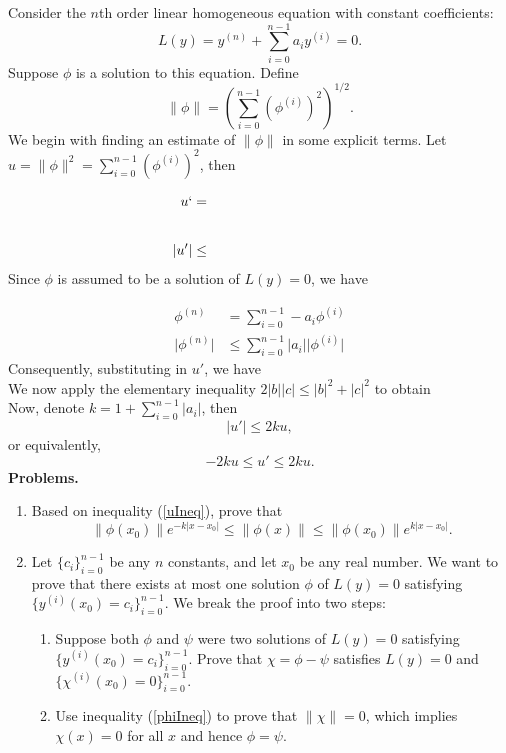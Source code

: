 \documentclass[10pt]{article}
\title{}
\date{}
\newcommand{\norm}[1]{\lVert #1 \rVert}
\newcommand{\abs}[1]{\lvert #1 \rvert}
\begin{document}
Consider the $n$th order linear homogeneous equation with constant coefficients:
\[
	L(y) =y^{(n)} +  \sum_{i = 0}^{n - 1}a_iy^{(i)} = 0.
\]
Suppose $\phi$ is a solution to this equation. Define
\[
\norm{\phi} = \left(\sum_{i = 0}^{n - 1} {\left(\phi^{(i)}\right)^2}\right)^{1/2}.
\]
We begin with finding an estimate of $\norm{\phi}$ in some explicit terms. Let $u = \norm{\phi}^2 = \sum_{i = 0}^{n - 1} {\left(\phi^{(i)}\right)^2}$, then

\begin{align*}
u ` &=\hspace{10em} \\[2em]
\abs{u'}& \leq\\
\end{align*}
Since $\phi$ is assumed to be a solution of $L(y) = 0$, we have

\begin{align*}
	\phi^{(n)} &= \sum_{i = 0}^{n - 1} -a_i\phi^{(i)}\\
	\abs{\phi^{(n)}} &\leq  \sum_{i = 0}^{n - 1} \abs{a_i}\abs{\phi^{(i)}}
\end{align*}
Consequently, substituting in $u'$, we have
\\
We now apply the elementary inequality $2\abs{b}\abs{c} \leq \abs{b}^2 + \abs{c}^2$
to obtain
\\
Now, denote $k =1 + \sum_{i = 0}^{n - 1}\abs{a_i}$, then 
\[
\abs{u'} \leq 2ku,
\]
or equivalently, 
\begin{equation}
\label{uIneq}
-2ku \leq {u'} \leq 2ku.
\end{equation}
\clearpage
\noindent
{\bf Problems.}
\begin{enumerate}
\item
Based on inequality (\ref{uIneq}), prove that
\begin{equation}
\label{phiIneq}
	\norm{\phi(x_0)}e^{-k\abs{x - x_0}} \leq \norm{\phi(x)}\leq \norm{\phi(x_0)}e^{k\abs{x - x_0}}.
\end{equation}
\item Let $\{c_i\}_{i=0}^{n-1}$ be any $n$ constants, and let $x_0$ be any real number. We want to prove that there exists at most one solution $\phi$  of $L(y) = 0$ satisfying $\{y^{(i)}(x_0) = c_i\}_{i=0}^{n-1}$. We break the proof into two steps:
\begin{enumerate}
\item
  Suppose both $\phi$ and $\psi$ were two solutions of $L(y) = 0$ satisfying $\{y^{(i)}(x_0) = c_i\}_{i=0}^{n-1}$. Prove that $\chi = \phi - \psi$ satisfies $L(y) = 0$ and $\{\chi^{(i)}(x_0) = 0\}_{i=0}^{n-1}$.
\item Use inequality (\ref{phiIneq}) to prove that $\norm{\chi} = 0$, which implies $\chi(x) = 0$ for all $x$ and hence $\phi = \psi$.
\end{enumerate}

\end{enumerate}
\end{document}
